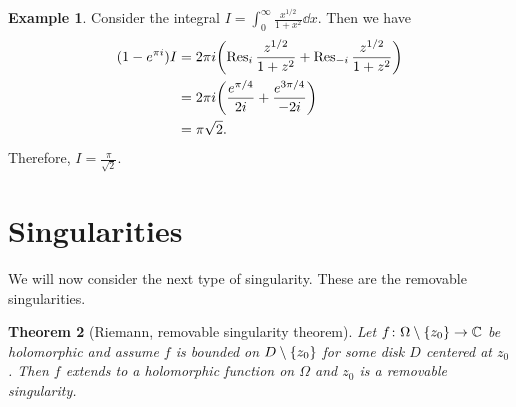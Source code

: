\documentclass[leqno, openany]{memoir}
\newtheorem{thm}{Theorem}[section]
\theoremstyle{definition}
\newtheorem{exm}[thm]{Example}
\theoremstyle{remark}
\theoremstyle{plain}
\theoremstyle{definition}
\theoremstyle{remark}
\newcommand{\C}{\mathbb{C}}
\begin{document}
\begin{exm} Consider the integral $I = \int_0^{\infty} \frac{x^{1/2}}{1 + x^2}
    \dd{x}$. Then we have \begin{align*} (1 - e^{\pi i}) I &= 2 \pi i \qty(
        \Res_i \frac{z^{1/2}}{1+z^2} + \Res_{-i} \frac{z^{1/2}}{1+z^2} ) \\ &=
        2 \pi i \qty(\frac{e^{\pi/4}}{2i} + \frac{e^{3 \pi/4}}{-2i}) \\ &= \pi
    \sqrt{2}.  \end{align*} Therefore, $I = \frac{\pi}{\sqrt{2}}$.  \end{exm}

\section{Singularities}%

We will now consider the next type of singularity. These are the removable
singularities.

\begin{thm}[Riemann, removable singularity theorem] Let $f \colon \Omega
    \setminus \qty{z_0} \to \C$ be holomorphic and assume $f$ is bounded on $D
    \setminus \qty{z_0}$ for some disk $D$ centered at $z_0$. Then $f$ extends
    to a holomorphic function on $\Omega$ and $z_0$ is a removable singularity.
\end{thm}
\end{document}
